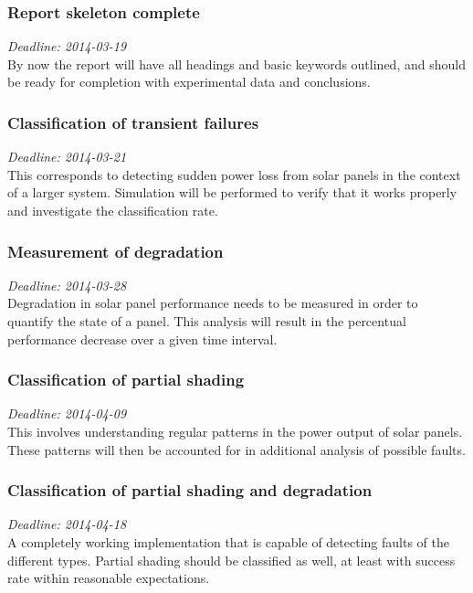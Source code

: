 \documentclass[a4paper,11pt]{article}
\begin{document}
\subsubsection*{Report skeleton complete}
\noindent
\emph{Deadline: 2014-03-19}\\
\noindent
By now the report will have all headings and basic keywords outlined, and should be ready for completion with experimental data and conclusions.

\subsubsection*{Classification of transient failures}
\noindent
\emph{Deadline: 2014-03-21}\\
\noindent
This corresponds to detecting sudden power loss from solar panels in the context of a larger system.
Simulation will be performed to verify that it works properly and investigate the classification rate.

\subsubsection*{Measurement of degradation}
\noindent
\emph{Deadline: 2014-03-28}\\
\noindent
Degradation in solar panel performance needs to be measured in order to quantify the state of a panel.
This analysis will result in the percentual performance decrease over a given time interval.

\subsubsection*{Classification of partial shading}
\noindent
\emph{Deadline: 2014-04-09}\\
\noindent
This involves understanding regular patterns in the power output of solar panels.
These patterns will then be accounted for in additional analysis of possible faults.

\subsubsection*{Classification of partial shading and degradation}
\noindent
\emph{Deadline: 2014-04-18}\\
\noindent
A completely working implementation that is capable of detecting faults of the different types.
Partial shading should be classified as well, at least with success rate within reasonable expectations.
\end{document}
